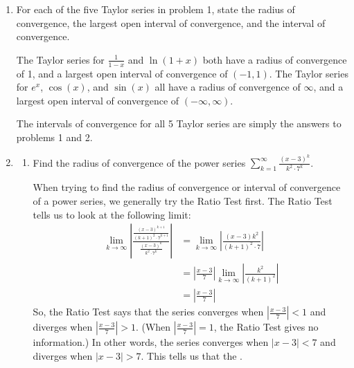 \documentclass[main]{subfiles}
\begin{document}
\begin{enumerate}[resume]
\pspace{\newpage}

\item 
 
 \begin{problem}[0.5in]
For each of the five Taylor series in problem 1, state the radius of convergence, the largest open interval of convergence, and the interval of convergence. 
\end{problem}

\begin{solution}
The Taylor series for $\frac{1}{1-x}$ and $\ln(1+x)$ both have a radius of convergence of 1, and a largest open interval of convergence of $(-1,1)$. The Taylor series for $e^x$, $\cos(x)$, and $\sin(x)$ all have a radius of convergence of $\infty$, and a largest open interval of convergence of $(-\infty, \infty)$.

The intervals of convergence for all 5 Taylor series are simply the answers to problems 1 and 2.
\end{solution}

\item 
\begin{enumerate}
  \item 
  \begin{problem}[2.5in]
  Find the radius of convergence of the power series $\displaystyle
  \sum_{k=1}^\infty \frac{(x - 3)^k}{k^2 \cdot 7^k}$.
  \end{problem}

  \begin{solution}
  When trying to find the radius of convergence or interval of
  convergence of a power series, we generally try the Ratio Test
  first.  The Ratio Test tells us to look at the following limit: 
  \begin{align*}
  \lim_{k \to \infty} \left| \frac{\frac{(x - 3)^{k + 1}}{(k + 1)^2
  \cdot 7^{k+1}}}{\frac{(x - 3)^k}{k^2 \cdot 7^k}} \right| &=
  \lim_{k \to \infty} \left| \frac{(x - 3) k^2}{(k + 1)^2 \cdot 7}
  \right| \\
  &= \left| \frac{x - 3}{7} \right| \lim_{k \to \infty} \left|
  \frac{k^2}{(k + 1)^2} \right| \\
  &= \left| \frac{x - 3}{7} \right|
  \end{align*}
  So, the Ratio Test says that the series converges when
  $\displaystyle \left| \frac{x - 3}{7} \right| < 1$ and diverges when
  $\displaystyle \left| \frac{x - 3}{7} \right| > 1$.  (When
  $\displaystyle \left| \frac{x - 3}{7} \right| = 1$, the Ratio Test
  gives no information.)  In other words, the series converges when
  $|x - 3| < 7$ and diverges when $|x - 3| > 7$.  This tells us that
  the .


\end{solution}
\end{enumerate}
\end{enumerate}
\end{document}
